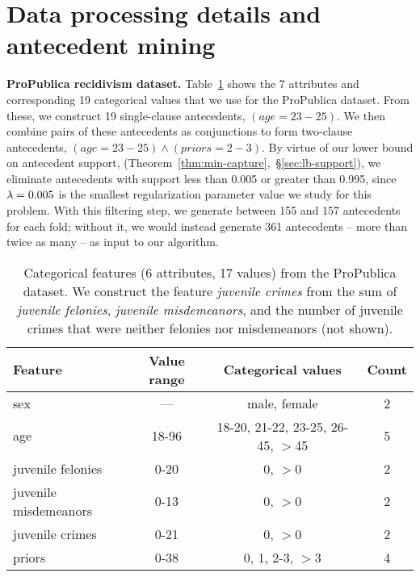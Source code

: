 \section{Data processing details and antecedent mining}
\label{appendix:data}

\textbf{ProPublica recidivism dataset.}
Table~\ref{tab:recidivism-data} shows the 7 attributes
and corresponding 19 categorical values
that we use for the ProPublica dataset.
%
From these, we construct 19 single-clause antecedents, \eg ${(age = 23-25)}$.
%
We then combine pairs of these antecedents as conjunctions to form
two-clause antecedents, \eg ${(age = 23-25) \wedge (priors = 2-3)}$.
%
By virtue of our lower bound on antecedent support,
(Theorem~\ref{thm:min-capture},~\S\ref{sec:lb-support}),
we eliminate antecedents with support less than 0.005 or greater than 0.995,
since ${{\lambda} = 0.005}$ is the smallest regularization parameter value
we study for this problem.
%
With this filtering step, we generate between 155 and 157 antecedents
for each fold; without it, we would instead generate 361 antecedents --
more than twice as many -- as input to our algorithm.

\begin{table}[h!]
\centering
\begin{tabular}{l  | c  c  c}
Feature & Value range & Categorical values & Count \\
\hline
sex & --- & male, female & 2 \\
age & 18-96 & 18-20, 21-22, 23-25, 26-45, $>$45  & 5 \\
juvenile felonies & 0-20 & 0, $>$0 & 2 \\
juvenile misdemeanors & 0-13 & 0, $>$0 & 2 \\
juvenile crimes & 0-21 & 0, $>$0 & 2 \\
priors & 0-38 & 0, 1, 2-3, $>$3 & 4
\end{tabular}
\caption{Categorical features (6 attributes, 17 values) from the ProPublica dataset.
We construct the feature \emph{juvenile crimes} from the sum of
\emph{juvenile felonies}, \emph{juvenile misdemeanors}, and
the number of juvenile crimes that were neither felonies nor misdemeanors (not shown).
}
\vspace{4mm}
\label{tab:recidivism-data}
\end{table}

